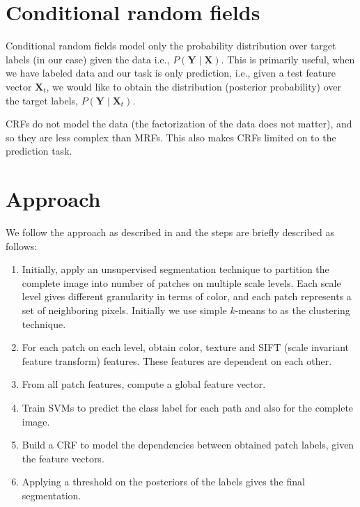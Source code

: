 \documentclass[a4paper]{article}
\begin{document}
\section{Conditional random fields}
\label{sec_crf}
Conditional random fields model only the probability distribution over target
labels (in our case) given the data i.e., $P(\mathbf{Y} \mid \mathbf{X})$. This 
is primarily useful, when we have labeled data and our task is only prediction, 
i.e., given a test feature vector $\mathbf{X}_t$, we would like to obtain the 
distribution (posterior probability) over the target labels, $P(\mathbf{Y} \mid 
\mathbf{X}_t)$.

CRFs do not model the data (the factorization of the data does not matter), and 
so they are less complex than MRFs. This also makes CRFs limited on to the
prediction task.

\section{Approach}
\label{sec_approach}

We follow the approach as described in \cite{icml_2009} and the steps are 
briefly described as follows:

\begin{enumerate}

\item Initially, apply an unsupervised segmentation technique to partition 
the complete image into number of patches on multiple scale levels. Each scale 
level gives different granularity in terms of color, and each patch represents
a set of neighboring pixels. Initially we use simple $k$-means to as the 
clustering technique.

\item For each patch on each level, obtain color, texture and SIFT (scale 
invariant feature transform) features. These features are dependent on each 
other.

\item From all patch features, compute a global feature vector.

\item Train SVMs to predict the class label for each path and also for the 
complete image.

\item Build a CRF to model the dependencies between obtained patch labels, 
given the feature vectors.

\item Applying a threshold on the posteriors of the labels gives the final 
segmentation.

\end{enumerate}
\end{document}
